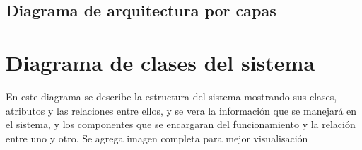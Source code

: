 \documentclass[12pt]{article}
\begin{document}
\subsection{Diagrama de arquitectura por capas}
\begin{center}
\end{center}




\section{Diagrama de clases del sistema}
En este diagrama se describe la estructura del sistema mostrando sus clases, atributos y las relaciones entre ellos, y se vera la informaci\'on que se manejar\'a en el sistema, y los componentes que se encargaran del funcionamiento y la relaci\'on entre uno y otro.
Se agrega imagen completa para mejor visualisaci\'on
\end{document}

